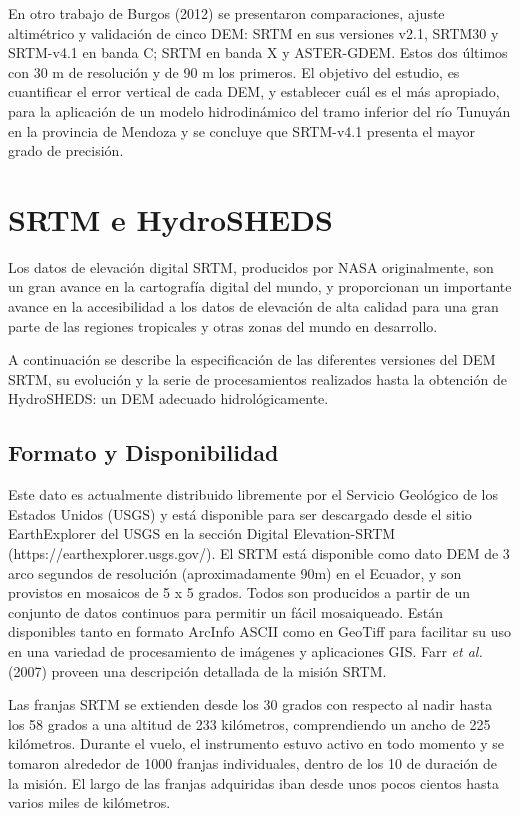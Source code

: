 \documentclass[10pt,a4paper, twoside]{report}
\begin{document}
En otro trabajo de Burgos (2012) se presentaron comparaciones, ajuste altimétrico y validación de cinco DEM: SRTM en sus versiones v2.1, SRTM30 y SRTM-v4.1 en banda C; SRTM en banda X y ASTER-GDEM. Estos dos últimos con 30 m de resolución y de 90 m los primeros. El objetivo del estudio, es cuantificar el error vertical de cada DEM, y
establecer cuál es el más apropiado, para la aplicación de un modelo hidrodinámico del tramo inferior del río Tunuyán en la provincia de Mendoza y se concluye que SRTM-v4.1 presenta el mayor grado de precisión. 

\section{SRTM e HydroSHEDS}
\label{SRTMeHydroSHEDS}

Los datos de elevación digital SRTM, producidos por NASA originalmente, son un gran avance en la cartografía digital del mundo, y proporcionan un importante avance en la accesibilidad a los datos de elevación de alta calidad para una gran parte de las regiones tropicales y otras zonas del mundo en desarrollo.

A continuación se describe la especificación de las diferentes versiones del DEM SRTM, su evolución y la serie de procesamientos realizados hasta la obtención de HydroSHEDS: un DEM adecuado hidrológicamente.



\subsection{Formato y Disponibilidad}

Este dato es actualmente distribuido libremente por el Servicio Geológico de los Estados Unidos (USGS) y está disponible para ser descargado desde el sitio EarthExplorer del USGS en la sección Digital Elevation-SRTM (https://earthexplorer.usgs.gov/). El SRTM está disponible como dato DEM de 3 arco segundos de resolución (aproximadamente 90m) en el Ecuador, y son provistos en mosaicos de 5 x 5 grados. Todos son producidos a partir de un conjunto de datos continuos para permitir un fácil mosaiqueado. Están disponibles tanto en formato ArcInfo ASCII como en GeoTiff para facilitar su uso en una variedad de procesamiento de imágenes y aplicaciones GIS. Farr \textit{et al.} (2007) proveen una descripción detallada de la misión SRTM.

Las franjas SRTM se extienden desde los 30 grados con respecto al nadir hasta los 58 grados a una altitud de 233 kilómetros, comprendiendo un ancho de 225 kilómetros. Durante el vuelo, el instrumento estuvo activo en todo momento y se tomaron alrededor de 1000 franjas individuales, dentro de los 10 de duración de la misión. El largo de las franjas adquiridas iban desde unos pocos cientos hasta varios miles de kilómetros.
\end{document}
